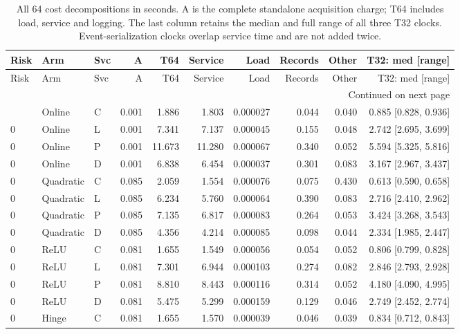 \begingroup
\scriptsize
\setlength{\tabcolsep}{3pt}
\begin{longtable}{lllrrrrrrr}
\caption{All 64 cost decompositions in seconds. A is the complete standalone acquisition charge; T64 includes load, service and logging. The last column retains the median and full range of all three T32 clocks. Event-serialization clocks overlap service time and are not added twice.}\label{tab:allcost120}\\
\toprule
Risk & Arm & Svc & A & T64 & Service & Load & Records & Other & T32: med [range] \\ \midrule
\endfirsthead
\toprule
Risk & Arm & Svc & A & T64 & Service & Load & Records & Other & T32: med [range] \\ \midrule
\endhead
\midrule\multicolumn{10}{r}{Continued on next page}\\\endfoot
\bottomrule\endlastfoot
0 & Online & C & 0.001 & 1.886 & 1.803 & 0.000027 & 0.044 & 0.040 & 0.885 [0.828, 0.936] \\
0 & Online & L & 0.001 & 7.341 & 7.137 & 0.000045 & 0.155 & 0.048 & 2.742 [2.695, 3.699] \\
0 & Online & P & 0.001 & 11.673 & 11.280 & 0.000067 & 0.340 & 0.052 & 5.594 [5.325, 5.816] \\
0 & Online & D & 0.001 & 6.838 & 6.454 & 0.000037 & 0.301 & 0.083 & 3.167 [2.967, 3.437] \\
0 & Quadratic & C & 0.085 & 2.059 & 1.554 & 0.000076 & 0.075 & 0.430 & 0.613 [0.590, 0.658] \\
0 & Quadratic & L & 0.085 & 6.234 & 5.760 & 0.000064 & 0.390 & 0.083 & 2.716 [2.410, 2.962] \\
0 & Quadratic & P & 0.085 & 7.135 & 6.817 & 0.000083 & 0.264 & 0.053 & 3.424 [3.268, 3.543] \\
0 & Quadratic & D & 0.085 & 4.356 & 4.214 & 0.000085 & 0.098 & 0.044 & 2.334 [1.985, 2.447] \\
0 & ReLU & C & 0.081 & 1.655 & 1.549 & 0.000056 & 0.054 & 0.052 & 0.806 [0.799, 0.828] \\
0 & ReLU & L & 0.081 & 7.301 & 6.944 & 0.000103 & 0.274 & 0.082 & 2.846 [2.793, 2.928] \\
0 & ReLU & P & 0.081 & 8.810 & 8.443 & 0.000116 & 0.314 & 0.052 & 4.180 [4.090, 4.995] \\
0 & ReLU & D & 0.081 & 5.475 & 5.299 & 0.000159 & 0.129 & 0.046 & 2.749 [2.452, 2.774] \\
0 & Hinge & C & 0.081 & 1.655 & 1.570 & 0.000039 & 0.046 & 0.039 & 0.834 [0.712, 0.843] \\

\end{longtable}
